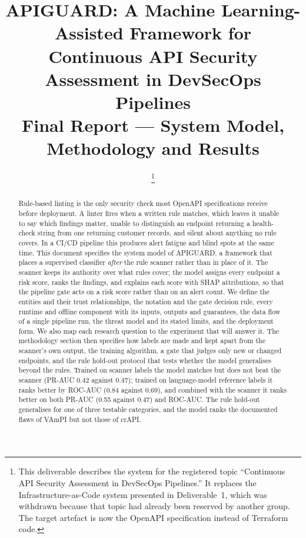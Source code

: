 \documentclass[conference]{IEEEtran}
\begin{document}
\title{APIGUARD: A Machine Learning-Assisted Framework for\\
Continuous API Security Assessment in DevSecOps Pipelines\\
\large Final Report --- System Model, Methodology and Results}

\author{
\thanks{This deliverable describes the system for the registered topic
``Continuous API Security Assessment in DevSecOps Pipelines.'' It replaces the
Infrastructure-as-Code system presented in Deliverable~1, which was withdrawn because that
topic had already been reserved by another group. The target artefact is now the OpenAPI specification instead of Terraform code.}}

\maketitle

\begin{abstract}
Rule-based linting is the only security check most OpenAPI specifications receive before
deployment. A linter fires when a written rule matches, which leaves it unable to say which
findings matter, unable to distinguish an endpoint returning a health-check string from one
returning customer records, and silent about anything no rule covers. In a CI/CD pipeline
this produces alert fatigue and blind spots at the same time. This document specifies the
system model of APIGUARD, a framework that places a supervised classifier \emph{after} the
rule scanner rather than in place of it. The scanner keeps its authority over what rules
cover; the model assigns every endpoint a risk score, ranks the findings, and explains each
score with SHAP attributions, so that the pipeline gate acts on a risk score rather than on
an alert count. We define the entities and their trust relationships, the notation and the
gate decision rule, every runtime and offline component with its inputs, outputs and
guarantees, the data flow of a single pipeline run, the threat model and its stated limits,
and the deployment form. We also map each research question to the experiment that will
answer it. The methodology section then specifies how labels are made and kept apart from the
scanner's own output, the training algorithm, a gate that judges only new or changed endpoints,
and the rule hold-out protocol that tests whether the model generalises beyond the rules.
Trained on scanner labels the model matches but does not beat the scanner (PR-AUC 0.42 against 0.47); trained on language-model reference labels it ranks better by ROC-AUC (0.84 against 0.69), and combined with the scanner it ranks better on both PR-AUC (0.55 against 0.47) and ROC-AUC. The rule hold-out generalises for one of three testable categories, and the model ranks the documented flaws of VAmPI but not those of crAPI.
\end{abstract}
\end{document}
